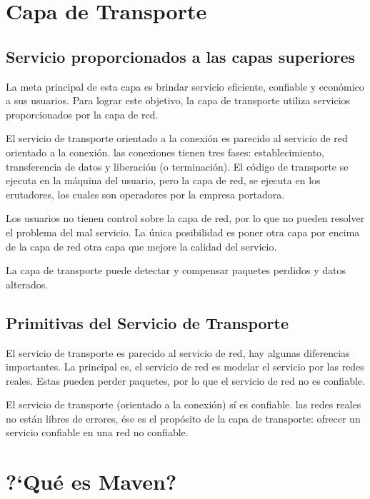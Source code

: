 \documentclass[12pt]{report}
\begin{document}
\section*{Capa de Transporte}

\subsection*{Servicio proporcionados a las capas superiores}		

La meta principal de esta capa es brindar servicio eficiente, confiable y econ\'omico a sus usuarios. Para lograr este objetivo, la capa de transporte utiliza servicios proporcionados por la capa de red. 

El servicio de transporte orientado a la conexi\'on es parecido al servicio de red orientado a la conexi\'on. las conexiones tienen tres fases: establecimiento, transferencia de datos y liberaci\'on (o terminaci\'on). El c\'odigo de transporte se ejecuta en la m\'aquina del usuario, pero la capa de red, se ejecuta en los erutadores, los cuales son operadores por la empresa portadora.

Los usuarios no tienen control sobre la capa de red, por lo que no pueden resolver el problema del mal servicio. La \'unica posibilidad es poner otra capa por encima de la capa de red otra capa que mejore la calidad del servicio. 

La capa de transporte puede detectar y compensar paquetes perdidos y datos alterados.

\subsection*{Primitivas del Servicio de Transporte}

El servicio de transporte es parecido al servicio de red, hay algunas diferencias importantes. La principal es, el servicio de red es modelar el servicio por las redes reales. Estas pueden perder paquetes, por lo que el servicio de red no es confiable. 

El servicio de transporte (orientado a la conexi\'on) s\'i es confiable. las redes reales no est\'an libres de errores, \'ese es el prop\'osito de la capa de transporte: ofrecer un servicio confiable en una red no confiable.


        \section*{?`Qu\'e es Maven?}
\end{document}
